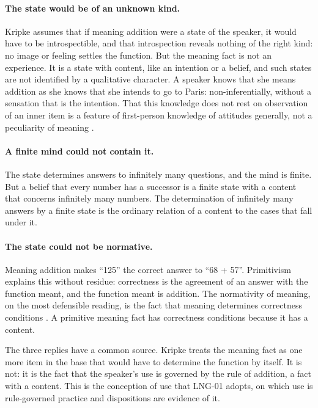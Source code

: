 \documentclass{situationist-preprint}
\begin{document}
\paragraph{The state would be of an unknown kind.} Kripke assumes that if meaning addition were a state of the speaker, it would have to be introspectible, and that introspection reveals nothing of the right kind: no image or feeling settles the function. But the meaning fact is not an experience. It is a state with content, like an intention or a belief, and such states are not identified by a qualitative character. A speaker knows that she means addition as she knows that she intends to go to Paris: non-inferentially, without a sensation that is the intention. That this knowledge does not rest on observation of an inner item is a feature of first-person knowledge of attitudes generally, not a peculiarity of meaning \citep{Boghossian1989}.

\paragraph{A finite mind could not contain it.} The state determines answers to infinitely many questions, and the mind is finite. But a belief that every number has a successor is a finite state with a content that concerns infinitely many numbers. The determination of infinitely many answers by a finite state is the ordinary relation of a content to the cases that fall under it.

\paragraph{The state could not be normative.} Meaning addition makes \enquote{125} the correct answer to \enquote{68 + 57}. Primitivism explains this without residue: correctness is the agreement of an answer with the function meant, and the function meant is addition. The normativity of meaning, on the most defensible reading, is the fact that meaning determines correctness conditions \citep{Hattiangadi2007}. A primitive meaning fact has correctness conditions because it has a content.

The three replies have a common source. Kripke treats the meaning fact as one more item in the base that would have to determine the function by itself. It is not: it is the fact that the speaker's use is governed by the rule of addition, a fact with a content. This is the conception of use that LNG-01 adopts, on which use is rule-governed practice and dispositions are evidence of it.
\end{document}
